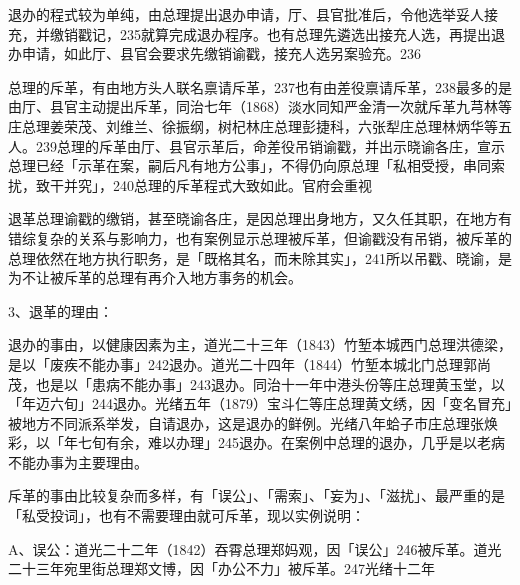 \noindent 退办的程式较为单纯，由总理提出退办申请，厅、县官批准后，令他选举妥人接充，并缴销戳记，235就算完成退办程序。也有总理先遴选出接充人选，再提出退办申请，如此厅、县官会要求先缴销谕戳，接充人选另案验充。236


\noindent 总理的斥革，有由地方头人联名禀请斥革，237也有由差役禀请斥革，238最多的是由厅、县官主动提出斥革，同治七年（1868）淡水同知严金清一次就斥革九芎林等庄总理姜荣茂、刘维兰、徐振纲，树杞林庄总理彭捷科，六张犁庄总理林炳华等五人。239总理的斥革由厅、县官示革后，命差役吊销谕戳，并出示晓谕各庄，宣示总理已经「示革在案，嗣后凡有地方公事」，不得仍向原总理「私相受授，串同索扰，致干并究」，240总理的斥革程式大致如此。官府会重视

\vfill
\begin{BookNotes}
\end{BookNotes}

\noindent 退革总理谕戳的缴销，甚至晓谕各庄，是因总理出身地方，又久任其职，在地方有错综复杂的关系与影响力，也有案例显示总理被斥革，但谕戳没有吊销，被斥革的总理依然在地方执行职务，是「既格其名，而未除其实」，241所以吊戳、晓谕，是为不让被斥革的总理有再介入地方事务的机会。

3、退革的理由：


\noindent 退办的事由，以健康因素为主，道光二十三年（1843）竹堑本城西门总理洪德梁，是以「废疾不能办事」242退办。道光二十四年（1844）竹堑本城北门总理郭尚茂，也是以「患病不能办事」243退办。同治十一年中港头份等庄总理黄玉堂，以「年迈六旬」244退办。光绪五年（1879）宝斗仁等庄总理黄文绣，因「变名冒充」被地方不同派系举发，自请退办，这是退办的鲜例。光绪八年蛤子市庄总理张焕彩，以「年七旬有余，难以办理」245退办。在案例中总理的退办，几乎是以老病不能办事为主要理由。


\noindent 斥革的事由比较复杂而多样，有「误公」、「需索」、「妄为」、「滋扰」、最严重的是「私受投词」，也有不需要理由就可斥革，现以实例说明：

A、误公：道光二十二年（1842）吞霄总理郑妈观，因「误公」246被斥革。道光二十三年宛里街总理郑文博，因「办公不力」被斥革。247光绪十二年

